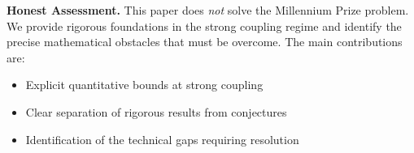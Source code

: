 \textbf{Honest Assessment.} This paper does \emph{not} solve the Millennium Prize problem. We provide rigorous foundations in the strong coupling regime and identify the precise mathematical obstacles that must be overcome. The main contributions are:
\begin{itemize}
    \item Explicit quantitative bounds at strong coupling
    \item Clear separation of rigorous results from conjectures
    \item Identification of the technical gaps requiring resolution
\end{itemize}






